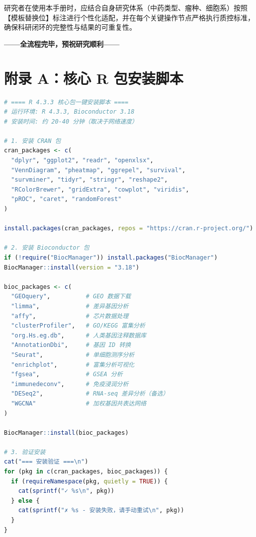 \documentclass[12pt,a4paper,twoside]{article}
\begin{document}
研究者在使用本手册时，应结合自身研究体系（中药类型、瘤种、细胞系）按照【模板替换位】标注进行个性化适配，并在每个关键操作节点严格执行质控标准，确保科研闭环的完整性与结果的可重复性。

\vspace{12pt}

\begin{center}
{\large\bfseries\color{darkblue} ——全流程完毕，预祝研究顺利——}
\end{center}

\clearpage
{}



\clearpage

\appendix
\section{附录 A：核心 R 包安装脚本}
\label{appendix:r_packages}

\begin{lstlisting}[language=R,caption={R 4.3.3 核心包一键安装脚本}]
# ==== R 4.3.3 核心包一键安装脚本 ====
# 运行环境: R 4.3.3, Bioconductor 3.18
# 安装时间: 约 20-40 分钟（取决于网络速度）

# 1. 安装 CRAN 包
cran_packages <- c(
  "dplyr", "ggplot2", "readr", "openxlsx",
  "VennDiagram", "pheatmap", "ggrepel", "survival",
  "survminer", "tidyr", "stringr", "reshape2",
  "RColorBrewer", "gridExtra", "cowplot", "viridis",
  "pROC", "caret", "randomForest"
)

install.packages(cran_packages, repos = "https://cran.r-project.org/")

# 2. 安装 Bioconductor 包
if (!require("BiocManager")) install.packages("BiocManager")
BiocManager::install(version = "3.18")

bioc_packages <- c(
  "GEOquery",          # GEO 数据下载
  "limma",             # 差异基因分析
  "affy",              # 芯片数据处理
  "clusterProfiler",   # GO/KEGG 富集分析
  "org.Hs.eg.db",      # 人类基因注释数据库
  "AnnotationDbi",     # 基因 ID 转换
  "Seurat",            # 单细胞测序分析
  "enrichplot",        # 富集分析可视化
  "fgsea",             # GSEA 分析
  "immunedeconv",      # 免疫浸润分析
  "DESeq2",            # RNA-seq 差异分析（备选）
  "WGCNA"              # 加权基因共表达网络
)

BiocManager::install(bioc_packages)

# 3. 验证安装
cat("=== 安装验证 ===\n")
for (pkg in c(cran_packages, bioc_packages)) {
  if (requireNamespace(pkg, quietly = TRUE)) {
    cat(sprintf("✓ %s\n", pkg))
  } else {
    cat(sprintf("✗ %s - 安装失败，请手动重试\n", pkg))
  }
}
\end{lstlisting}
\end{document}

